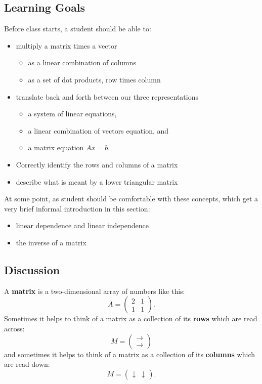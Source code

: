 \documentclass[10pt,]{book}
\newcommand{\terminology}[1]{\textbf{#1}}
\theoremstyle{plain}
\theoremstyle{definition}
\numberwithin{equation}{section}
\begin{document}
\subsection[Learning Goals]{Learning Goals}\label{subsection-11}
Before class starts, a student should be able to:
      \begin{itemize}
\item{}multiply a matrix times a vector
          \begin{itemize}
\item{}as a linear combination of columns\item{}as a set of dot products, row times column\end{itemize}

        \item{}translate back and forth between our three representations
          \begin{itemize}
\item{}a system of linear equations,\item{}a linear combination of vectors equation, and\item{}a matrix equation \(Ax=b\).\end{itemize}

        \item{}Correctly identify the rows and columns of a matrix\item{}describe what is meant by a lower triangular matrix\end{itemize}

    At some point, as student should be comfortable with these concepts, which
    get a very brief informal introduction in this section:
    \begin{itemize}
\item{}linear dependence and linear independence\item{}the inverse of a matrix\end{itemize}

\typeout{************************************************}
\typeout{************************************************}
\subsection[Discussion]{Discussion}\label{subsection-12}

      A \terminology{matrix} is a two-dimensional array of numbers like this:\[
        A = \begin{pmatrix} 2 & 1 \\ 1 & 1 \end{pmatrix}.
      \]
      Sometimes it helps to think of a matrix as a collection of its \terminology{rows}
      which are read across:\[
        M = \begin{pmatrix} \longrightarrow \\ \longrightarrow \end{pmatrix}
      \]
      and sometimes it helps to think of a matrix as a collection of its
      \terminology{columns} which are read down:\[
        M = \begin{pmatrix} \downarrow & \downarrow \end{pmatrix}.
      \]
\par
\end{document}
